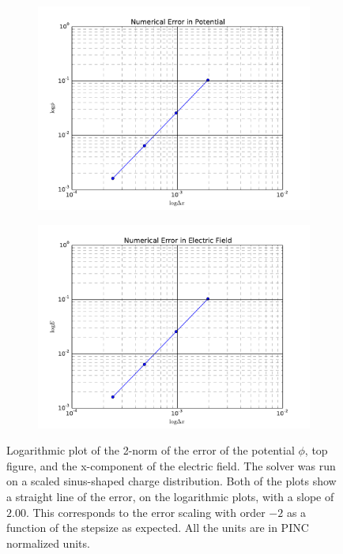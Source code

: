 \begin{figure}
    \centering
    \begin{subfigure}[b]{\textwidth}
        \includegraphics[width = \textwidth]{figures/verification/errorScaling/errorloglogPotential}
    \end{subfigure}
	\begin{subfigure}[b]{\textwidth}
		\includegraphics[width = \textwidth]{figures/verification/errorScaling/errorloglogE}
	\end{subfigure}
    \caption{Logarithmic plot of the 2-norm of the error of the potential \(\phi\), top figure, and the
    x-component of the electric field. The solver was run on a scaled sinus-shaped charge distribution.
    Both of the plots show a straight line of the error, on the logarithmic plots, with a slope
    of \(2.00\). This corresponds to the error scaling with order \(-2\) as a function of the
	stepsize as expected. All the units are in PINC normalized units.}
    \label{fig:errorScaling}
\end{figure}
